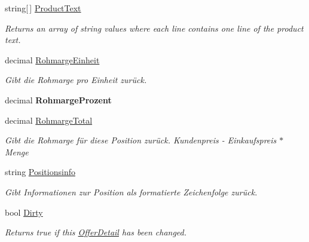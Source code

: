 \begin{DoxyCompactItemize}
\item 
string\mbox{[}$\,$\mbox{]} \hyperlink{class_products_1_1_model_1_1_entities_1_1_offer_detail_a05c96b803a218afd70c1b7e8b1203c74}{Product\+Text}
\begin{DoxyCompactList}\small\item\em Returns an array of string values where each line contains one line of the product text. \end{DoxyCompactList}\item 
decimal \hyperlink{class_products_1_1_model_1_1_entities_1_1_offer_detail_ac6b0dd95da209071cb1b638c99f85006}{Rohmarge\+Einheit}
\begin{DoxyCompactList}\small\item\em Gibt die Rohmarge pro Einheit zurück. \end{DoxyCompactList}\item 
decimal {\bfseries Rohmarge\+Prozent}\hypertarget{class_products_1_1_model_1_1_entities_1_1_offer_detail_a8343413b3724bc213afec656a95f5073}{}\label{class_products_1_1_model_1_1_entities_1_1_offer_detail_a8343413b3724bc213afec656a95f5073}

\item 
decimal \hyperlink{class_products_1_1_model_1_1_entities_1_1_offer_detail_a01a5f4609d7ea56e4d7eca8da01a7980}{Rohmarge\+Total}
\begin{DoxyCompactList}\small\item\em Gibt die Rohmarge für diese Position zurück. Kundenpreis -\/ Einkaufspreis $\ast$ Menge \end{DoxyCompactList}\item 
string \hyperlink{class_products_1_1_model_1_1_entities_1_1_offer_detail_a83d35caf73235daa629b56a2fab5faf9}{Positionsinfo}
\begin{DoxyCompactList}\small\item\em Gibt Informationen zur Position als formatierte Zeichenfolge zurück. \end{DoxyCompactList}\item 
bool \hyperlink{class_products_1_1_model_1_1_entities_1_1_offer_detail_a235495491bec9b068176289f64b09b6f}{Dirty}
\begin{DoxyCompactList}\small\item\em Returns true if this \hyperlink{class_products_1_1_model_1_1_entities_1_1_offer_detail}{Offer\+Detail} has been changed. \end{DoxyCompactList}\end{DoxyCompactItemize}


